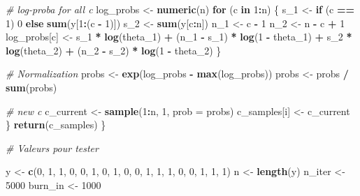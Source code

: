 \documentclass[
]{article}
\newenvironment{Shaded}{\begin{snugshade}}{\end{snugshade}}
\newcommand{\AttributeTok}[1]{\textcolor[rgb]{0.13,0.29,0.53}{#1}}
\newcommand{\CommentTok}[1]{\textcolor[rgb]{0.56,0.35,0.01}{\textit{#1}}}
\newcommand{\ControlFlowTok}[1]{\textcolor[rgb]{0.13,0.29,0.53}{\textbf{#1}}}
\newcommand{\DecValTok}[1]{\textcolor[rgb]{0.00,0.00,0.81}{#1}}
\newcommand{\FunctionTok}[1]{\textcolor[rgb]{0.13,0.29,0.53}{\textbf{#1}}}
\newcommand{\NormalTok}[1]{#1}
\newcommand{\OtherTok}[1]{\textcolor[rgb]{0.56,0.35,0.01}{#1}}
\newcommand{\SpecialCharTok}[1]{\textcolor[rgb]{0.81,0.36,0.00}{\textbf{#1}}}
\begin{document}
\begin{Shaded}
\begin{Highlighting}[]
    \CommentTok{\# log{-}proba for all c}
\NormalTok{    log\_probs }\OtherTok{\textless{}{-}} \FunctionTok{numeric}\NormalTok{(n)}
    \ControlFlowTok{for}\NormalTok{ (c }\ControlFlowTok{in} \DecValTok{1}\SpecialCharTok{:}\NormalTok{n) \{}
\NormalTok{      s\_1 }\OtherTok{\textless{}{-}} \ControlFlowTok{if}\NormalTok{ (c }\SpecialCharTok{==} \DecValTok{1}\NormalTok{) }\DecValTok{0} \ControlFlowTok{else} \FunctionTok{sum}\NormalTok{(y[}\DecValTok{1}\SpecialCharTok{:}\NormalTok{(c }\SpecialCharTok{{-}} \DecValTok{1}\NormalTok{)])}
\NormalTok{      s\_2 }\OtherTok{\textless{}{-}} \FunctionTok{sum}\NormalTok{(y[c}\SpecialCharTok{:}\NormalTok{n])}
\NormalTok{      n\_1 }\OtherTok{\textless{}{-}}\NormalTok{ c }\SpecialCharTok{{-}} \DecValTok{1}
\NormalTok{      n\_2 }\OtherTok{\textless{}{-}}\NormalTok{ n }\SpecialCharTok{{-}}\NormalTok{ c }\SpecialCharTok{+} \DecValTok{1}
\NormalTok{      log\_probs[c] }\OtherTok{\textless{}{-}}\NormalTok{ s\_1 }\SpecialCharTok{*} \FunctionTok{log}\NormalTok{(theta\_1) }\SpecialCharTok{+}\NormalTok{ (n\_1 }\SpecialCharTok{{-}}\NormalTok{ s\_1) }\SpecialCharTok{*} \FunctionTok{log}\NormalTok{(}\DecValTok{1} \SpecialCharTok{{-}}\NormalTok{ theta\_1) }\SpecialCharTok{+}
\NormalTok{        s\_2 }\SpecialCharTok{*} \FunctionTok{log}\NormalTok{(theta\_2) }\SpecialCharTok{+}\NormalTok{ (n\_2 }\SpecialCharTok{{-}}\NormalTok{ s\_2) }\SpecialCharTok{*} \FunctionTok{log}\NormalTok{(}\DecValTok{1} \SpecialCharTok{{-}}\NormalTok{ theta\_2)}
\NormalTok{    \}}
    
    \CommentTok{\# Normalization}
\NormalTok{    probs }\OtherTok{\textless{}{-}} \FunctionTok{exp}\NormalTok{(log\_probs }\SpecialCharTok{{-}} \FunctionTok{max}\NormalTok{(log\_probs))}
\NormalTok{    probs }\OtherTok{\textless{}{-}}\NormalTok{ probs }\SpecialCharTok{/} \FunctionTok{sum}\NormalTok{(probs)}
    
    \CommentTok{\# new c}
\NormalTok{    c\_current }\OtherTok{\textless{}{-}} \FunctionTok{sample}\NormalTok{(}\DecValTok{1}\SpecialCharTok{:}\NormalTok{n, }\DecValTok{1}\NormalTok{, }\AttributeTok{prob =}\NormalTok{ probs)}
\NormalTok{    c\_samples[i] }\OtherTok{\textless{}{-}}\NormalTok{ c\_current}
\NormalTok{  \}}
  \FunctionTok{return}\NormalTok{(c\_samples)}
\NormalTok{\}}

\CommentTok{\# Valeurs pour tester}

\NormalTok{y }\OtherTok{\textless{}{-}} \FunctionTok{c}\NormalTok{(}\DecValTok{0}\NormalTok{, }\DecValTok{1}\NormalTok{, }\DecValTok{1}\NormalTok{, }\DecValTok{0}\NormalTok{, }\DecValTok{0}\NormalTok{, }\DecValTok{1}\NormalTok{, }\DecValTok{0}\NormalTok{, }\DecValTok{1}\NormalTok{, }\DecValTok{0}\NormalTok{, }\DecValTok{0}\NormalTok{, }\DecValTok{1}\NormalTok{, }\DecValTok{1}\NormalTok{, }\DecValTok{1}\NormalTok{, }\DecValTok{0}\NormalTok{, }\DecValTok{0}\NormalTok{, }\DecValTok{1}\NormalTok{, }\DecValTok{1}\NormalTok{, }\DecValTok{1}\NormalTok{)}
\NormalTok{n }\OtherTok{\textless{}{-}} \FunctionTok{length}\NormalTok{(y)}
\NormalTok{n\_iter }\OtherTok{\textless{}{-}} \DecValTok{5000}
\NormalTok{burn\_in }\OtherTok{\textless{}{-}} \DecValTok{1000}




\end{Highlighting}
\end{Shaded}
\end{document}
